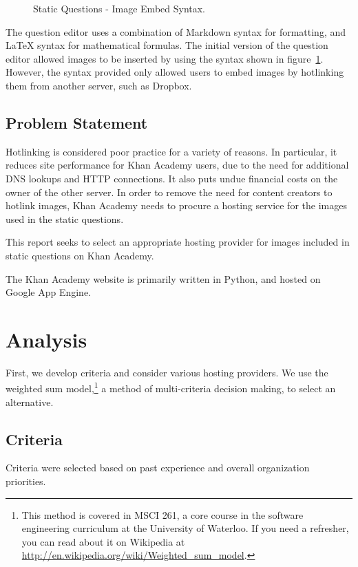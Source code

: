 \documentclass[se]{uw-wkrpt}
\begin{document}
\begin{figure}
  \centering
  
  \caption{Static Questions - Image Embed Syntax.}
  \label{fig:imgsyntax}
\end{figure}

The question editor uses a combination of Markdown syntax for formatting, and 
LaTeX syntax for mathematical formulas. The initial version of the question 
editor allowed images to be inserted by using the syntax shown in 
figure~\ref{fig:imgsyntax}. However, the syntax provided only allowed users to 
embed images by hotlinking them from another server, such as Dropbox.

\subsection{Problem Statement}\label{sec:problem}
Hotlinking is considered poor practice for a variety of reasons. In particular, 
it reduces site performance for Khan Academy users, due to the need for 
additional DNS lookups and HTTP connections. It also puts undue financial costs 
on the owner of the other server. In order to remove the need for content 
creators to hotlink images, Khan Academy needs to procure a hosting service for 
the images used in the static questions.

This report seeks to select an appropriate hosting provider for images included 
in static questions on Khan Academy.

The Khan Academy website is primarily written in Python, and hosted on Google 
App Engine.

\section{Analysis}
First, we develop criteria and consider various hosting providers. We use the 
weighted sum model,\footnote{This method is covered in MSCI 261, a core course 
in the software engineering curriculum at the University of Waterloo. If you 
need a refresher, you can read about it on Wikipedia at
\url{http://en.wikipedia.org/wiki/Weighted_sum_model}.} a method of
multi-criteria decision making, to select an alternative.

\subsection {Criteria}
Criteria were selected based on past experience and overall organization 
priorities.
\end{document}
